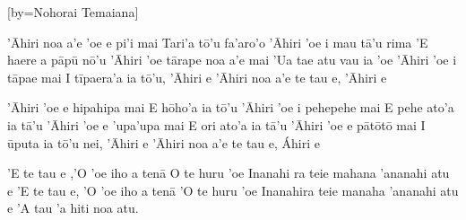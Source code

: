 [by={Nohorai Temaiana}]
\transpose{\shift}

\beginverse
'\={A}hiri noa a'e 'oe e pi'i mai 
Tari'a t\={o}'u fa'aro'o 
'\={A}hiri 'oe i mau t\={a}'u rima
'E haere a p\={a}p\={u} n\={o}'u 
'\={A}hiri 'oe t\={a}rape noa a'e mai 
'Ua tae atu vau ia 'oe 
'\={A}hiri 'oe i t\={a}pae mai 
I t\={i}paera'a ia t\={o}'u, '\={A}hiri e 
'\={A}hiri noa a'e te tau e, '\={A}hiri e 
\endverse

\beginverse
'\={A}hiri 'oe e hipahipa mai 
E h\={o}ho'a ia t\={o}'u 
'\={A}hiri 'oe i pehepehe mai 
E pehe ato'a ia t\={a}'u 
'\={A}hiri 'oe e 'upa'upa mai 
E ori ato'a ia t\={a}'u 
'\={A}hiri 'oe e p\={a}t\={o}t\={o} mai 
I \={u}puta ia t\={o}'u nei, '\={A}hiri e
'\={A}hiri noa a'e te tau e, \'{A}hiri e 
\endverse

\beginchorus
'E te tau e ,'O 'oe iho a ten\={a} 
O te huru 'oe 
Inanahi ra teie mahana 'ananahi atu e 
'E te tau e, 'O 'oe iho a ten\={a} 
'O te huru 'oe 
Inanahira teie manaha 'ananahi atu e 
'A tau 'a hiti noa atu.
\endchorus
\endsong

